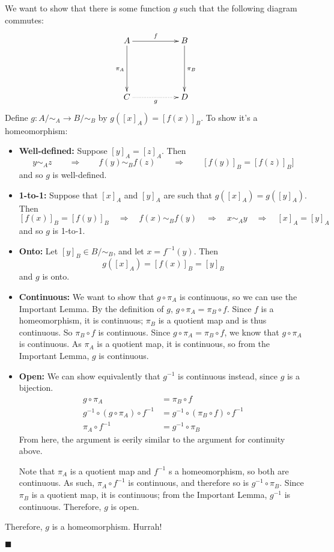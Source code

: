 \documentclass[11pt]{amsart}
\begin{document}
We want to show that there is some function $g$ such that the following diagram commutes:
\[ \xymatrix{ A \ar[rr]^f \ar[dd]_{\pi_A} && B \ar[dd]^{\pi_B} \\ &&\\C \ar @{.>}[rr]_g & & D } \]
Define $g:A/\sim_A \to B/\sim_B$ by $g\left([x]_A\right) = \left[ f(x) \right]_B$.  To show it's a homeomorphism:
\begin{itemize}
\item {\bf Well-defined:} Suppose $[y]_A = [z]_A$.  Then 
\[y\sim_A z\qquad\Rightarrow\qquad f(y) \sim_B f(z) \qquad\Rightarrow \qquad[f(y)]_B = [f(z)]_B]\]
and so $g$ is well-defined.
\item {\bf 1-to-1:} Suppose that $[x]_A$ and $[y]_A$ are such that $g([x]_A) = g([y]_A)$.  Then
\[ [f(x)]_B = [f(y)]_B\quad\Rightarrow\quad f(x)\sim_B f(y)\quad\Rightarrow\quad x\sim_A y \quad\Rightarrow\quad [x]_A = [y]_A\]
and so $g$ is 1-to-1.
\item {\bf Onto: } Let $[y]_B\in B/\sim_B$, and let $x = f^{-1}(y)$.  Then
\[ g([x]_A) = [f(x)]_B = [y]_B \]
and $g$ is onto.
\item {\bf Continuous: } We want to show that $g\circ \pi_A$ is continuous, so we can use the Important Lemma.  By the definition of $g$, $g\circ \pi_A = \pi_B\circ f$.  Since $f$ is a homeomorphism, it is continuous; $\pi_B$ is a quotient map and is thus continuous.  So $\pi_B\circ f$ is continuous.  Since $g\circ \pi_A = \pi_B\circ f$, we know that $g\circ \pi_A$ is continuous.  As $\pi_A$ is a quotient map, it is continuous, so from the Important Lemma, $g$ is continuous.
\item {\bf Open: }  We can show equivalently that $g^{-1}$ is continuous instead, since $g$ is a bijection.
\begin{align*}
g\circ\pi_A &= \pi_B\circ f \\
g^{-1}\circ(g\circ\pi_A)\circ f^{-1} &= g^{-1}\circ(\pi_B\circ f)\circ f^{-1} \\
\pi_A\circ f^{-1} & =g^{-1}\circ \pi_B
\end{align*}
From here, the argument is eerily similar to the argument for continuity above.

Note that $\pi_A$ is a quotient map and $f^{-1}$ s a homeomorphism, so both are continuous.  As such, $\pi_A\circ f^{-1}$ is continuous, and therefore so is $g^{-1}\circ \pi_B$.  Since $\pi_B$ is a quotient map, it is continuous; from the Important Lemma, $g^{-1}$ is continuous.  Therefore, $g$ is open.
\end{itemize}
Therefore, $g$ is a homeomorphism. Hurrah!\begin{flushright}$\blacksquare$\end{flushright}
\end{document}
